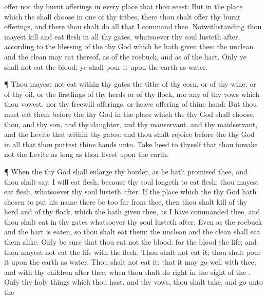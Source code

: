{offer not thy burnt
offerings in every
place that thou
seest:
But in the
place which the
{} shall
choose in
one of thy
tribes, there thou shalt
offer thy burnt
offerings, and there thou shalt
do all that I
command thee.
Notwithstanding thou mayest
kill and
eat
flesh in all thy
gates, whatsoever thy
soul lusteth
after, according to the
blessing of the
{} thy
God which he hath
given thee: the
unclean and the
clean may
eat thereof, as of the
roebuck, and as of the
hart.
Only ye shall not
eat the
blood; ye shall
pour it upon the
earth as
water.
\par }{\PP {}¶ Thou
mayest not
eat within thy
gates the
tithe of thy
corn, or of thy
wine, or of thy
oil, or the
firstlings of thy
herds or of thy
flock, nor any of thy
vows which thou
vowest, nor thy freewill
offerings, or heave
offering of thine
hand:
But thou must
eat them
before the
{} thy
God in the
place which the
{} thy
God shall
choose, thou, and thy
son, and thy
daughter, and thy
manservant, and thy
maidservant, and the
Levite that
{} within thy
gates: and thou shalt
rejoice
before the
{} thy
God in all that thou
puttest thine
hands unto.
Take
heed to thyself that thou
forsake not the
Levite as long as thou
livest upon the
earth.
\par }{\PP {}¶ When the
{} thy
God shall
enlarge thy
border, as he hath
promised thee, and thou shalt
say, I will
eat
flesh, because thy
soul
longeth to
eat
flesh; thou mayest
eat
flesh, whatsoever thy
soul lusteth
after.
If the
place which the
{} thy
God hath
chosen to
put his
name there be too
far from thee, then thou shalt
kill of thy
herd and of thy
flock, which the
{} hath
given thee, as I have
commanded thee, and thou shalt
eat in thy
gates whatsoever thy
soul lusteth
after.
Even as the
roebuck and the
hart is
eaten, so thou shalt
eat them: the
unclean and the
clean shall
eat
{} them
alike.
Only be
sure that thou
eat not the
blood: for the
blood
{} the
life; and thou mayest not
eat the
life with the
flesh.
Thou shalt not
eat it; thou shalt
pour it upon the
earth as
water.
Thou shalt not
eat it; that it may go
well with thee, and with thy
children
after thee, when thou shalt
do
{}
right in the
sight of the
{}.
Only thy holy
things which thou hast, and thy
vows, thou shalt
take, and
go unto the
}

